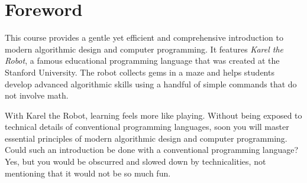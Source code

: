 \documentclass[article,A4,12pt]{llncs}
\begin{document}
{%
%
%
%
}


\newpage
\setcounter{tocdepth}{2}
\tableofcontents

\newpage

\pagestyle{plain}
\setcounter{page}{1}

\pagestyle{plain}
\setcounter{page}{1}
\section*{Foreword}
This course provides a gentle yet efficient and comprehensive introduction to modern algorithmic 
design and computer programming. It features {\em Karel the Robot}, a famous educational programming 
language that was created at the Stanford University. The robot collects gems in a maze and helps 
students develop advanced algorithmic skills using a handful of simple commands that do not involve 
math. 

With Karel the Robot, learning feels more like playing. Without being exposed to technical details 
of conventional programming languages, soon you will master essential principles of modern 
algorithmic design and computer programming.
Could such an introduction be done with a conventional programming language? Yes, but 
you would be obscurred and slowed down by technicalities, not mentioning that it would 
not be so much fun. 
\end{document}
